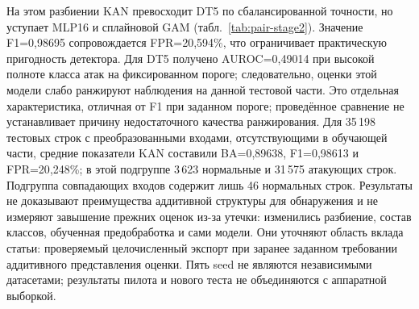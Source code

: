 \begin{table}[!htbp]
\centering
\caption{Дополнительный тест с непересекающимися парами адресов:
среднее $\pm$ выборочное стандартное отклонение по пяти seed на одних и тех же
38\,087 строках. Отклонение описывает вариацию оптимизации на одном разбиении,
а не доверительный интервал. FPR и TPR приведены в процентах.}
\label{tab:pair-stage2}
\small
{}
\end{table}

На этом разбиении KAN превосходит DT5 по сбалансированной точности, но уступает
MLP16 и сплайновой GAM (табл.~\ref{tab:pair-stage2}). Значение
F1=0{,}98695 сопровождается FPR=20{,}594\%, что ограничивает практическую
пригодность детектора. Для DT5 получено AUROC=0{,}49014 при высокой полноте класса атак на фиксированном пороге; следовательно, оценки этой модели слабо ранжируют наблюдения на данной тестовой части. Это отдельная характеристика, отличная от F1 при заданном пороге; проведённое сравнение не устанавливает причину недостаточного качества ранжирования. Для 35\,198 тестовых строк с преобразованными входами,
отсутствующими в обучающей части, средние показатели KAN составили BA=0{,}89638,
F1=0{,}98613 и FPR=20{,}248\%; в этой подгруппе 3\,623 нормальные и
31\,575 атакующих строк. Подгруппа совпадающих входов содержит лишь 46
нормальных строк. Результаты не доказывают преимущества аддитивной структуры
для обнаружения и не измеряют завышение прежних оценок из-за утечки:
изменились разбиение, состав классов, обученная предобработка и сами модели.
Они уточняют область вклада статьи: проверяемый целочисленный экспорт при
заранее заданном требовании аддитивного представления оценки. Пять seed не
являются независимыми датасетами; результаты пилота и нового теста не
объединяются с аппаратной выборкой.
